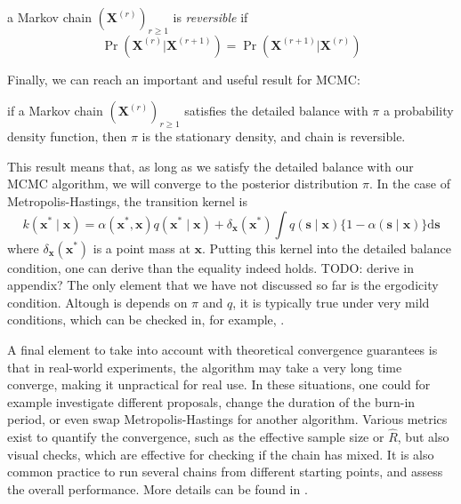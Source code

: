 \documentclass[12pt]{memoir}
\newcommand{\mb}{\mathbf}
\newcommand{\ti}{\textit}
\begin{document}
\begin{boxedthm}
    a Markov chain $(\mb X^{(r)})_{r\geq1}$ is \ti{reversible} if
\begin{equation}
    \Pr(\mb X^{(r)} | \mb X^{(r+1)}) = \Pr(\mb X^{(r+1)} | \mb X^{(r)})
\end{equation}
\end{boxedthm}
Finally, we can reach an important and useful result for MCMC:

\begin{boxedthm}
    if a Markov chain $(\mb X^{(r)})_{r\geq1}$ satisfies the detailed balance with $\pi$ a probability density function, then $\pi$ is the stationary density, and chain is reversible.
\end{boxedthm}

This result means that, as long as we satisfy the detailed balance with our MCMC algorithm, we will converge to the posterior distribution $\pi$. In the case of Metropolis-Hastings, the transition kernel is 
\begin{equation}
    k\left(\boldsymbol{x}^* \mid \boldsymbol{x}\right)=\alpha\left(\boldsymbol{x}^*, \boldsymbol{x}\right) q\left(\boldsymbol{x}^* \mid \boldsymbol{x}\right)+\delta_{\boldsymbol{x}}\left(\boldsymbol{x}^*\right) \int q(\boldsymbol{s} \mid \boldsymbol{x})\{1-\alpha(\boldsymbol{s} \mid \boldsymbol{x})\} \mathrm{d} \boldsymbol{s}
\end{equation}
where $\delta_{\mb x}(\mb x^*)$ is a point mass at $\mb x$. Putting this kernel into the detailed balance condition, one can derive than the equality indeed holds. TODO: derive in appendix? The only element that we have not discussed so far is the ergodicity condition. Altough is depends on $\pi$ and $q$, it is typically true under very mild conditions, which can be checked in, for example, \cite{mcmc:RobertCasella2004}.\medbreak

A final element to take into account with theoretical convergence guarantees is that in real-world experiments, the algorithm may take a very long time converge, making it unpractical for real use. In these situations, one could for example investigate different proposals, change the duration of the burn-in period, or even swap Metropolis-Hastings for another algorithm. Various metrics exist to quantify the convergence, such as the effective sample size or $\hat R$, but also visual checks, which are effective for checking if the chain has mixed. It is also common practice to run several chains from different starting points, and assess the overall performance. More details can be found in \cite{mcmc:gelman2013bayesian}.
\end{document}
